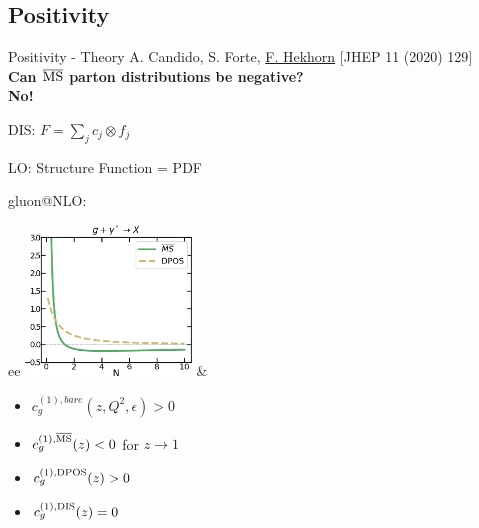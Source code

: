 \author[Felix Hekhorn]{}

\newcommand{\mmsbar}{{\overline{\rm {MS}}}}
\newcommand{\msbar}{$\mmsbar$}
\providecommand{\iRef}[1]{{\tiny\color{UniSec6} $[$#1$]$}}

\subsection{Positivity}

\begin{frame}{Positivity - Theory}
A. Candido, S. Forte, \underline{F. Hekhorn} \iRef{JHEP 11 (2020) 129}\\
{\bf Can \msbar{} parton distributions be negative?}\\
{\large \hfill \bf No!}

DIS: $F = \sum_j c_j \otimes f_j$

LO: Structure Function = PDF \checkmark

gluon@NLO:\\
\begin{tabular}{ee}
\includegraphics[height=4cm]{felix_positivity/disg.png}
&
\begin{itemize}
\item $c_g^{(1), bare}(z,Q^2,\epsilon) > 0$ \checkmark
\item $c_g^{(1), \mmsbar}(z) < 0$ for $z \to 1$
\item $c_g^{(1), \rm{DPOS}}(z) > 0$ \checkmark
\item $c_g^{(1), \rm{DIS}}(z) = 0$ \checkmark
\end{itemize}
\end{tabular}

\end{frame}

